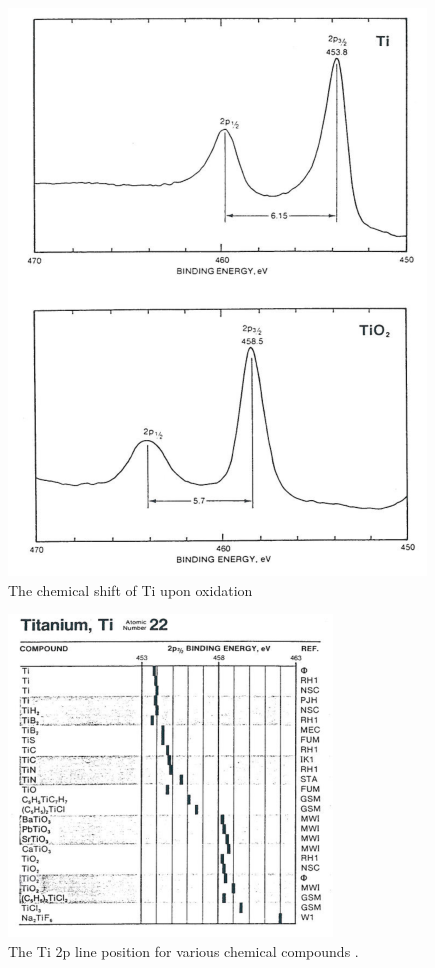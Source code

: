 \begin{figure}[h!]
	\begin{center}
	\includegraphics[scale=4]{figures/04_18.png}
	\caption{The chemical shift of Ti upon oxidation \cite{perkin}}
	\label{fig:tiox}
	\end{center}
\end{figure}

\begin{figure}[h!]
	\begin{center}
	\includegraphics[scale=4]{figures/04_19.png}
	\caption{The Ti 2p line position for various chemical compounds \cite{perkin}.}
	\label{fig:ti2p}
	\end{center}
\end{figure}

